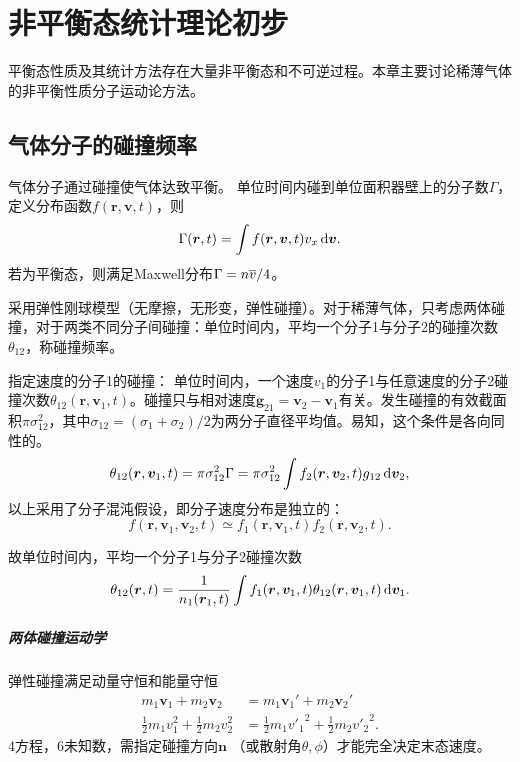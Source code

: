 \chapter{非平衡态统计理论初步}
平衡态性质及其统计方法存在大量非平衡态和不可逆过程。本章主要讨论稀薄气体的非平衡性质分子运动论方法。
\section{气体分子的碰撞频率}
气体分子通过碰撞使气体达致平衡。
单位时间内碰到单位面积器壁上的分子数$\Gamma$，定义分布函数$f(\bm r,\bm v,t)$，则
\[
	\Gamma(\bm r,t)=\int f(\bm r,\bm v,t)v_x\mathop{}\!\mathrm{d}\bm v.
\]
若为平衡态，则满足Maxwell分布$\Gamma=n\overline{v}/4$。

采用弹性刚球模型（无摩擦，无形变，弹性碰撞）。对于稀薄气体，只考虑两体碰撞，对于两类不同分子间碰撞：单位时间内，平均一个分子1与分子2的碰撞次数$\theta_{12}$，称碰撞频率。

指定速度的分子1的碰撞：
单位时间内，一个速度$v_1$的分子1与任意速度的分子2碰撞次数$\theta_{12}(\bm r,\bm v_1,t)$。碰撞只与相对速度$\bm g_{21}=\bm v_2-\bm v_1$有关。发生碰撞的有效截面积$\pi\sigma^2_{12}$，其中$\sigma_{12}=(\sigma_1+\sigma_2)/2$为两分子直径平均值。易知，这个条件是各向同性的。
\begin{align}
	\theta_{12}(\bm r,\bm v_1,t)=\pi\sigma_{12}^2\Gamma=\pi\sigma_{12}^2\int f_2(\bm r,\bm v_2,t)g_{12}\mathop{}\!\mathrm{d}\bm v_2,
\end{align}
以上采用了分子混沌假设，即分子速度分布是独立的：
\[
	f(\bm r,\bm v_1,\bm v_2,t)\simeq f_1(\bm r,\bm v_1,t)f_2(\bm r,\bm v_2,t).
\]

故单位时间内，平均一个分子1与分子2碰撞次数
\begin{align}
	\theta_{12}(\bm r,t)=\frac1{n_1(\bm r_1,t)}\int f_1(\bm r,\bm v_1,t)\theta_{12}(\bm r,\bm v_1,t)\mathop{}\!\mathrm{d}\bm v_1.
\end{align}
\paragraph{两体碰撞运动学}
弹性碰撞满足动量守恒和能量守恒
\begin{align}
	m_1\bm v_1+m_2\bm v_2&=m_1\bm v_1'+m_2\bm v_2'\\
	\frac12m_1v_1^2+\frac12m_2v_2^2&=\frac12m_1{v'_1}^2+\frac12m_2{v'_2}^2.
\end{align}
4方程，6未知数，需指定碰撞方向$\bm n$ （或散射角$\theta,\phi$）才能完全决定末态速度。

